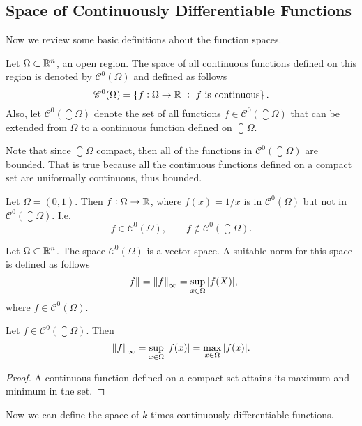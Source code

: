 \subsection{Space of Continuously Differentiable Functions}

Now we review some basic definitions about the function spaces.
\begin{definition}
	Let $ \Omega \subset \mathbb{R}^n $, an open region. The space of all continuous functions defined on this region is denoted by $ \mathscr{C}^0(\Omega) $ and defined as follows
	\[ \mathscr{C}^0(\Omega) = \Set{f:\Omega\to \R \ :\ f \text{ is continuous}}. \]
	Also, let $ \mathscr{C}^0(\closure{\Omega})$ denote the set of all functions $ f\in \mathscr{C}^0(\closure{\Omega}) $ that can be extended from $ \Omega $ to a continuous function defined on $ \closure{\Omega} $.\\
\end{definition}
\begin{remark}
	Note that since $ \closure{\Omega} $ compact, then all of the functions in $ \mathscr{C}^0(\closure{\Omega}) $ are bounded. That is true because all the continuous functions defined on a compact set are uniformally continuous, thus bounded.
\end{remark}

\begin{example}
	Let $ \Omega = (0,1) $. Then $ f: \Omega \to \mathbb{R} $, where $ f(x) = 1/x $ is in $ \mathscr{C}^0(\Omega) $ but not in $ \mathscr{C}^0(\closure{\Omega}) $. I.e.
	\[ f \in \mathscr{C}^0(\Omega), \qquad f\notin \mathscr{C}^0(\closure{\Omega}). \]
\end{example}


\begin{proposition}
	Let $ \Omega \subset \mathbb{R}^n $. The space $ \mathscr{C}^0(\Omega) $ is a vector space. A suitable norm for this space is defined as follows
	\[ \norm{f} = \norm{f}_\infty = \sup_{x\in \Omega}|f(X)|,\]
	where $ f \in \mathscr{C}^0(\Omega) $.
\end{proposition}

\begin{lemma}
	Let $ f \in \mathscr{C}^0(\closure{\Omega}) $. Then
	\[ \norm{f}_\infty = \sup_{x\in \Omega}|f(x)| = \max_{x\in \Omega}|f(x)|. \]
\end{lemma}
\begin{proof}
	A continuous function defined on a compact set attains its maximum and minimum in the set. 
\end{proof}
Now we can define the space of $ k $-times continuously differentiable functions. 

